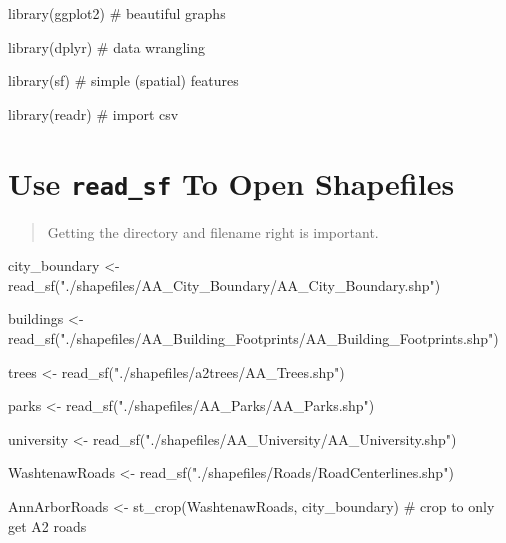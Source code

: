 \documentclass[
  letterpaper,
  DIV=11,
  numbers=noendperiod,
  oneside]{scrreprt}
\newenvironment{Shaded}{\begin{snugshade}}{\end{snugshade}}
\newcommand{\CommentTok}[1]{\textcolor[rgb]{0.37,0.37,0.37}{#1}}
\newcommand{\FunctionTok}[1]{\textcolor[rgb]{0.28,0.35,0.67}{#1}}
\newcommand{\NormalTok}[1]{\textcolor[rgb]{0.00,0.23,0.31}{#1}}
\newcommand{\OtherTok}[1]{\textcolor[rgb]{0.00,0.23,0.31}{#1}}
\newcommand{\StringTok}[1]{\textcolor[rgb]{0.13,0.47,0.30}{#1}}
\begin{document}
\begin{Shaded}
\begin{Highlighting}[]
\FunctionTok{library}\NormalTok{(ggplot2) }\CommentTok{\# beautiful graphs}

\FunctionTok{library}\NormalTok{(dplyr) }\CommentTok{\# data wrangling}

\FunctionTok{library}\NormalTok{(sf) }\CommentTok{\# simple (spatial) features}

\FunctionTok{library}\NormalTok{(readr) }\CommentTok{\# import csv}
\end{Highlighting}
\end{Shaded}

\section{\texorpdfstring{Use \texttt{read\_sf} To Open
Shapefiles}{Use read\_sf To Open Shapefiles}}\label{use-read_sf-to-open-shapefiles}

\begin{quote}
Getting the directory and filename right is important.
\end{quote}

\begin{Shaded}
\begin{Highlighting}[]
\NormalTok{city\_boundary }\OtherTok{\textless{}{-}} \FunctionTok{read\_sf}\NormalTok{(}\StringTok{"./shapefiles/AA\_City\_Boundary/AA\_City\_Boundary.shp"}\NormalTok{)}

\NormalTok{buildings }\OtherTok{\textless{}{-}} \FunctionTok{read\_sf}\NormalTok{(}\StringTok{"./shapefiles/AA\_Building\_Footprints/AA\_Building\_Footprints.shp"}\NormalTok{)}

\NormalTok{trees }\OtherTok{\textless{}{-}} \FunctionTok{read\_sf}\NormalTok{(}\StringTok{"./shapefiles/a2trees/AA\_Trees.shp"}\NormalTok{)}

\NormalTok{parks }\OtherTok{\textless{}{-}} \FunctionTok{read\_sf}\NormalTok{(}\StringTok{"./shapefiles/AA\_Parks/AA\_Parks.shp"}\NormalTok{)}

\NormalTok{university }\OtherTok{\textless{}{-}} \FunctionTok{read\_sf}\NormalTok{(}\StringTok{"./shapefiles/AA\_University/AA\_University.shp"}\NormalTok{)}

\NormalTok{WashtenawRoads }\OtherTok{\textless{}{-}} \FunctionTok{read\_sf}\NormalTok{(}\StringTok{"./shapefiles/Roads/RoadCenterlines.shp"}\NormalTok{)}

\NormalTok{AnnArborRoads }\OtherTok{\textless{}{-}} \FunctionTok{st\_crop}\NormalTok{(WashtenawRoads, }
\NormalTok{                         city\_boundary) }\CommentTok{\# crop to only get A2 roads}
\end{Highlighting}
\end{Shaded}
\end{document}
